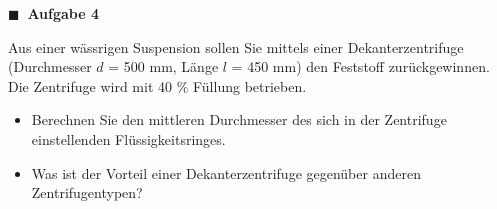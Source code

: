 \documentclass[aspectratio=169,9pt]{beamer}
\begin{document}
\begin{frame}
\begin{minipage}{.5\textwidth}


{\color{miugray}$\blacksquare ~$} \textbf{Aufgabe 4} \par \vspace*{2mm}
Aus einer wässrigen Suspension sollen Sie mittels einer Dekanterzentrifuge (Durchmesser $d$ = 500 mm, Länge $l$ = 450 mm) den Feststoff zurückgewinnen. Die Zentrifuge wird mit 40 \% Füllung betrieben.  
\begin{itemize}
\item[\color{miugray}$\blacktriangleright$] Berechnen Sie den mittleren Durchmesser des sich in der Zentrifuge einstellenden Flüssigkeitsringes.
\item[\color{miugray}$\blacktriangleright$] Was ist der Vorteil einer Dekanterzentrifuge gegenüber anderen Zentrifugentypen?
\end{itemize}
\begin{figure}
\centering
{}



\end{figure}
\end{minipage}
\end{frame}
\end{document}
